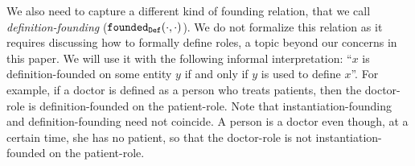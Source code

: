 \documentclass[sw]{iosart2x}
\newcommand{\bflist}{\begin{list}{}{\setlength{\topsep}{2mm}\setlength{\partopsep}{0mm}\setlength{\parsep}{0mm}\setlength{\leftmargin}{9mm}\setlength{\labelwidth}{8mm}}}
\newcommand{\eflist}{\end{list}}
\newcommand{\AxLabel}{\textrm{a}}
\newcommand{\DefLabel}{\textrm{d}}
\newcounter{cntax}
\newcommand{\myax}[1]{\refstepcounter{cntax}\begin{small}{\bf \AxLabel\thecntax\label{ax:#1}}\end{small}}
\newcommand{\mytext}[1]{``#1''}
\newcommand{\refdf}[1]{({\DefLabel}\ref{#1})}
\newcommand{\generalStyle}[1]{\texttt{#1}}
\newcommand{\uniRel}[2]{\generalStyle{#1}(#2)}
\newcommand{\biRelPar}[4]{\generalStyle{#1}_{\generalStyle{#4}}(#2,#3)}
\newcommand{\myfi}{\hspace{0.9mm} \Longrightarrow}
\newcommand{\DOLCEConcept}[1]{\uniRel{{CN}}{#1}}
\newcommand{\foundedDef}[2]{\biRelPar{\foundedTerm{passive}}{#1}{#2}{Def}}
\newcommand{\firstTimeKeyWord}[1]{\textit{#1}}
\newcommand{\foundedTerm}[1]{%
  \ifthenelse{\equal{#1}{passive}}{founded}{%
    \ifthenelse{\equal{#1}{verb}}{found}{%
      \ifthenelse{\equal{#1}{gerund}}{founding}{%
        ERROR!%
      }%
    }%
  }%
}
\newcommand{\TODOinline}[1]{{%
}}
\begin{document}
We also need to capture a different kind of founding relation, that we call \firstTimeKeyWord{definition-founding} ($\foundedDef{\cdot}{\cdot}$). We do not formalize this relation as it requires discussing how to formally define roles, a topic beyond our concerns in this paper. We will use it with the following informal interpretation: \mytext{$x$ is definition-founded on some entity $y$ if and only if $y$ is used to define $x$}.
For example, if a doctor is defined as a person who treats patients, then the doctor-role is definition-founded on the patient-role.  %
Note that instantiation-founding and definition-founding need not  coincide. A person is a doctor even though, at a certain time, she has no patient, so that the doctor-role is not instantiation-founded on the patient-role.
\end{document}
